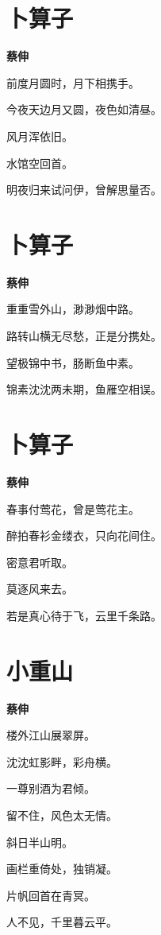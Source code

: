 \documentclass[12pt,a4paper]{ctexbook}
\begin{document}
\section{卜算子}
\textbf{蔡伸}\par\vspace{0.5em}
前度月圆时，月下相携手。\par
今夜天边月又圆，夜色如清昼。\par
风月浑依旧。\par
水馆空回首。\par
明夜归来试问伊，曾解思量否。\par

\section{卜算子}
\textbf{蔡伸}\par\vspace{0.5em}
重重雪外山，渺渺烟中路。\par
路转山横无尽愁，正是分携处。\par
望极锦中书，肠断鱼中素。\par
锦素沈沈两未期，鱼雁空相误。\par

\section{卜算子}
\textbf{蔡伸}\par\vspace{0.5em}
春事付莺花，曾是莺花主。\par
醉拍春衫金缕衣，只向花间住。\par
密意君听取。\par
莫逐风来去。\par
若是真心待于飞，云里千条路。\par

\section{小重山}
\textbf{蔡伸}\par\vspace{0.5em}
楼外江山展翠屏。\par
沈沈虹影畔，彩舟横。\par
一尊别酒为君倾。\par
留不住，风色太无情。\par
斜日半山明。\par
画栏重倚处，独销凝。\par
片帆回首在青冥。\par
人不见，千里暮云平。\par
\end{document}
